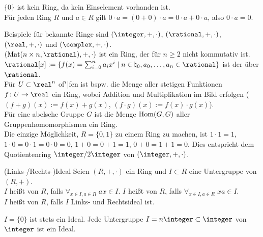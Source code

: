 \begin{Bem}
    $\{0\}$ ist kein Ring, da kein Einselement vorhanden ist.\\
    Für jeden Ring $R$ und $a \in R$ gilt
    $0 \cdot a = (0 + 0) \cdot a = 0 \cdot a + 0 \cdot a$, also
    $0 \cdot a = 0$.
\end{Bem}

\linie

\begin{Bsp}
    Beispiele für bekannte Ringe sind
    $(\integer, +, \cdot)$,
    $(\rational, +, \cdot)$,
    $(\real, +, \cdot)$ und
    $(\complex, +, \cdot)$.\\
    $(\Mat(n \times n, \rational), +, \cdot)$ ist ein Ring, der für
    $n \ge 2$ nicht kommutativ ist.\\
    $\rational[x] := \{f(x) = \sum_{i=0}^n a_i x^i \;|\; n \in \natural_0,
    a_0, \dotsc, a_n \in \rational\}$
    ist der  über $\rational$.\\
    Für $U \subset \real^n$ of"|fen ist bspw. die Menge aller stetigen
    Funktionen $f\colon U \rightarrow \real$ ein Ring, wobei Addition und
    Multiplikation im Bild erfolgen ($(f + g)(x) := f(x) + g(x)$,
    $(f \cdot g)(x) := f(x) \cdot g(x)$).\\
    Für eine abelsche Gruppe $G$ ist die Menge $\operatorname{Hom}(G, G)$ aller
    Gruppenhomomorphismen ein Ring.\\
    Die einzige Möglichkeit, $R = \{0, 1\}$ zu einem Ring zu machen, ist
    $1 \cdot 1 = 1$, $1 \cdot 0 = 0 \cdot 1 = 0 \cdot 0 = 0$,
    $1 + 0 = 0 + 1 = 1$, $0 + 0 = 1 + 1 = 0$.
    Dies entspricht dem Quotientenring $\integer/2\integer$ von
    $(\integer, +, \cdot)$.
\end{Bsp}

\linie

\begin{Def}{(Links-/Rechts-)Ideal}
    Seien $(R, +, \cdot)$ ein Ring und $I \subset R$ eine Untergruppe von
    $(R, +)$.\\
    $I$ heißt  von $R$, falls
    $\forall_{x \in I, a \in R}\; ax \in I$.
    $I$ heißt  von $R$, falls
    $\forall_{x \in I, a \in R}\; xa \in I$.\\
    $I$ heißt  von $R$, falls $I$ Links- und Rechtsideal ist.
\end{Def}

\begin{Bsp}
    $I = \{0\}$ ist stets ein Ideal.
    Jede Untergruppe $I = n\integer \subset \integer$ von $\integer$ ist ein
    Ideal.
\end{Bsp}

